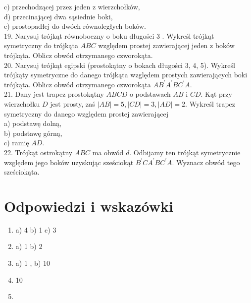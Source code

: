 \documentclass[10pt]{article}
\begin{document}
c) przechodzącej przez jeden z wierzchołków,\\
d) przecinającej dwa sąsiednie boki,\\
e) prostopadłej do dwóch równoległych boków.\\
19. Narysuj trójkąt równoboczny o boku długości 3 . Wykreśl trójkąt symetryczny do trójkąta \(A B C\) względem prostej zawierającej jeden z boków trójkąta. Oblicz obwód otrzymanego czworokąta.\\
20. Narysuj trójkąt egipski (prostokątny o bokach długości 3, 4, 5). Wykreśl trójkąty symetryczne do danego trójkąta względem prostych zawierających boki trójkąta. Oblicz obwód otrzymanego czworokąta \(A B^{\prime} A^{\prime} B C^{\prime} A\).\\
21. Dany jest trapez prostokątny \(A B C D\) o podstawach \(A B\) i \(C D\). Kąt przy wierzchołku \(D\) jest prosty, zaś \(|A B|=5,|C D|=3,|A D|=2\). Wykreśl trapez symetryczny do danego względem prostej zawierającej\\
a) podstawę dolną,\\
b) podstawę górną,\\
c) ramię \(A D\).\\
22. Trójkąt ostrokątny \(A B C\) ma obwód \(d\). Odbijamy ten trójkąt symetrycznie względem jego boków uzyskując sześciokąt \(B^{\prime} C A^{\prime} B C^{\prime} A\). Wyznacz obwód tego sześciokąta.

\section*{Odpowiedzi i wskazówki}
\begin{enumerate}
  \item a) 4 b) 1 c) 3
  \item a) 1 b) 2
  \item a) 1 , b) 10
  \item 10
  \item 
\end{enumerate}
\end{document}
